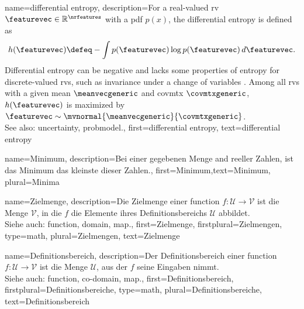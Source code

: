 {name={differential entropy},
	description={For a real-valued \gls{rv} $\featurevec \in \mathbb{R}^{\nrfeatures}$ 
		with a \gls{pdf} $p(x)$, the differential \gls{entropy} is defined as \cite{coverthomas}
		\[
		h(\featurevec) \defeq - \int p(\featurevec) \log p(\featurevec) \, d\featurevec.
		\]
		Differential \gls{entropy} can be negative and lacks some properties of \gls{entropy} for 
		discrete-valued \glspl{rv}, such as invariance under a change of variables \cite{coverthomas}. 
		Among all \glspl{rv} with a given \gls{mean} $\meanvecgeneric$ and \gls{covmtx} $\covmtxgeneric$, 
		$h(\featurevec)$ is maximized by $\featurevec \sim \mvnormal{\meanvecgeneric}{\covmtxgeneric}$. 
		\\
		See also: \gls{uncertainty}, \gls{probmodel}.},
	first={differential entropy},
	text={differential entropy}
}

{name=Minimum,
 description={Bei einer gegebenen Menge and reeller Zahlen, ist das Minimum  das kleinste dieser Zahlen.},
 first={Minimum},text={Minimum}, plural={Minima}
}

{name={Zielmenge}, 
	description={Die Zielmenge einer \gls{function} 
	$f: \mathcal{U} \rightarrow \mathcal{V}$ ist die Menge $\mathcal{V}$, 
	in die $f$ die Elemente ihres Definitionsbereichs $\mathcal{U}$ abbildet.  
	\\
	Siehe auch: \gls{function}, \gls{domain}, \gls{map}.},
	first={Zielmenge},
	firstplural={Zielmengen}, 
	type=math, 
	plural={Zielmengen},
	text={Zielmenge}
}

{name={Definitionsbereich}, 
	description={Der Definitionsbereich einer \gls{function} 
	$f: \mathcal{U} \rightarrow \mathcal{V}$ ist die Menge $\mathcal{U}$, 
	aus der $f$ seine Eingaben nimmt.  
	\\
	Siehe auch: \gls{function}, \gls{co-domain}, \gls{map}.},
	first={Definitionsbereich},
	firstplural={Definitionsbereiche}, 
	type=math, 
	plural={Definitionsbereiche},
	text={Definitionsbereich}
}


